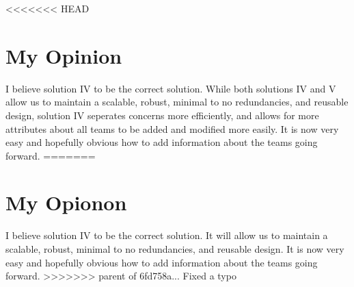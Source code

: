 \documentclass{article}
\begin{document}
<<<<<<< HEAD
\section{My Opinion}  I believe solution IV to be the correct solution. While both solutions IV and V allow us to maintain a scalable, robust, minimal to no redundancies, and reusable design, solution IV seperates concerns more efficiently, and allows for more attributes about all teams to be added and modified more easily. It is now very easy and hopefully obvious how to add information about the teams going forward.
=======
\section{My Opionon}  I believe solution IV to be the correct solution. It will allow us to maintain a scalable, robust, minimal to no redundancies, and reusable design. It is now very easy and hopefully obvious how to add information about the teams going forward.
>>>>>>> parent of 6fd758a... Fixed a typo





  
\end{document}
